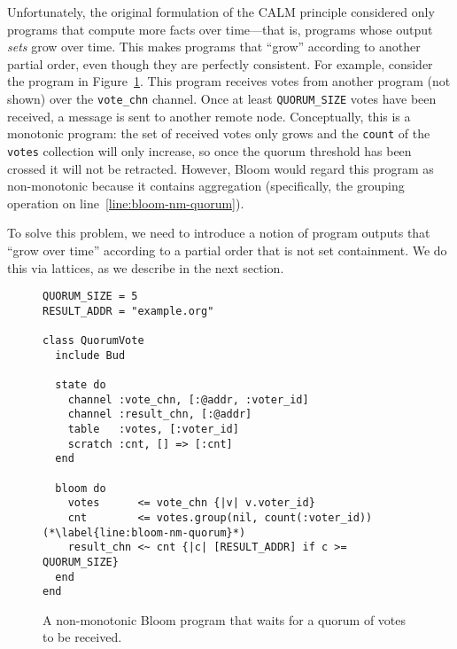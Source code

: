 Unfortunately, the original formulation of the CALM principle considered only
programs that compute more facts over time---that is, programs whose output
\emph{sets} grow over time. This makes programs that ``grow'' according to
another partial order, even though they are perfectly consistent. For example,
consider the program in Figure~\ref{fig:bloom-nm-quorum}. This program receives
votes from another program (not shown) over the \texttt{vote\_chn} channel. Once
at least \texttt{QUORUM\_SIZE} votes have been received, a message is sent to
another remote node. Conceptually, this is a monotonic program: the set of
received votes only grows and the \texttt{count} of the \texttt{votes}
collection will only increase, so once the quorum threshold has been crossed it
will not be retracted. However, Bloom would regard this program as non-monotonic
because it contains aggregation (specifically, the grouping operation on
line~\ref{line:bloom-nm-quorum}).

To solve this problem, we need to introduce a notion of program outputs that
``grow over time'' according to a partial order that is not set containment. We
do this via lattices, as we describe in the next section.

\begin{figure}[t]
\begin{scriptsize}
\begin{lstlisting}
QUORUM_SIZE = 5
RESULT_ADDR = "example.org"

class QuorumVote
  include Bud

  state do
    channel :vote_chn, [:@addr, :voter_id]
    channel :result_chn, [:@addr]
    table   :votes, [:voter_id]
    scratch :cnt, [] => [:cnt]
  end

  bloom do
    votes      <= vote_chn {|v| v.voter_id}
    cnt        <= votes.group(nil, count(:voter_id)) (*\label{line:bloom-nm-quorum}*)
    result_chn <~ cnt {|c| [RESULT_ADDR] if c >= QUORUM_SIZE}
  end
end
\end{lstlisting}
\end{scriptsize}
\caption{A non-monotonic Bloom program that waits for a quorum of votes to be received.}
\label{fig:bloom-nm-quorum}
\end{figure}
